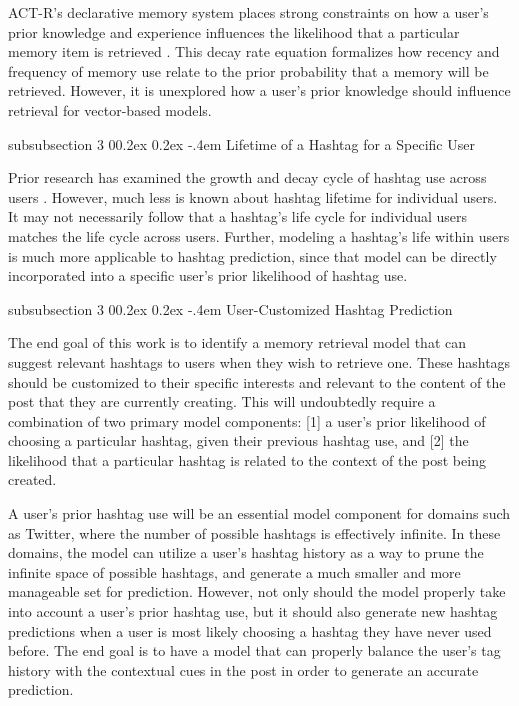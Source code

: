 \documentclass[man,floatsintext,donotrepeattitle]{apa6}
\makeatletter
\renewcommand{\subsubsection}{%
  \@startsection
  {subsubsection}%
  {3}%
  {\parindent}%
  {0\baselineskip \@plus 0.2ex \@minus 0.2ex}%
  {-.4em}%
  {\normalfont\normalsize\bfseries\addperi}}
\makeatother
\begin{document}
ACT-R's declarative memory system places strong constraints on how a user's prior knowledge and experience influences the likelihood that a particular memory item is retrieved \parencite{Anderson2007}.
This decay rate equation formalizes how recency and frequency of memory use relate to the prior probability that a memory will be retrieved.
However, it is unexplored how a user's prior knowledge should influence retrieval for vector-based models.

\subsubsection{Lifetime of a Hashtag for a Specific User}

Prior research has examined the growth and decay cycle of hashtag use across users \parencite{Tsur2012}.
However, much less is known about hashtag lifetime for individual users.
It may not necessarily follow that a hashtag's life cycle for individual users matches the life cycle across users.
Further, modeling a hashtag's life within users is much more applicable to hashtag prediction, since that model can be directly incorporated into a specific user's prior likelihood of hashtag use.

\subsubsection{User-Customized Hashtag Prediction}

The end goal of this work is to identify a memory retrieval model that can suggest relevant hashtags to users when they wish to retrieve one.
These hashtags should be customized to their specific interests and relevant to the content of the post that they are currently creating.
This will undoubtedly require a combination of two primary model components:
[1] a user's prior likelihood of choosing a particular hashtag, given their previous hashtag use, and [2] the likelihood that a particular hashtag is related to the context of the post being created. 

A user's prior hashtag use will be an essential model component for domains such as Twitter, where the number of possible hashtags is effectively infinite.
In these domains, the model can utilize a user's hashtag history as a way to prune the infinite space of possible hashtags, and generate a much smaller and more manageable set for prediction.
However, not only should the model properly take into account a user's prior hashtag use, but it should also generate new hashtag predictions when a user is most likely choosing a hashtag they have never used before.
The end goal is to have a model that can properly balance the user's tag history with the contextual cues in the post in order to generate an accurate prediction.
\end{document}
